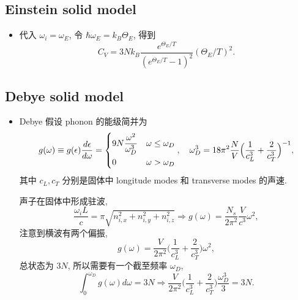 \subsection{Einstein solid model}
\begin{itemize}
	\item 代入 $\omega_i = \omega_E$, 令 $\hbar \omega_E = k_B \Theta_E$, 得到
	\begin{equation}
		C_V = 3 N k_B \frac{e^{\Theta_E / T}}{(e^{\Theta_E / T} - 1)^2} (\Theta_E / T)^2.
	\end{equation}
\end{itemize}

\subsection{Debye solid model}
\begin{itemize}
	\item Debye 假设 phonon 的能级简并为
	\begin{equation}
		g(\omega) \equiv g(\epsilon) \frac{d\epsilon}{d\omega} = \begin{dcases}
			9 N \frac{\omega^2}{\omega_D^3} & \omega \leq \omega_D \\
			0 & \omega > \omega_D
		\end{dcases}, \quad \omega_D^3 = 18 \pi^2 \frac{N}{V} \Big( \frac{1}{c_L^3} + \frac{2}{c_T^3} \Big)^{- 1},
	\end{equation}
	其中 $c_L, c_T$ 分别是固体中 longitude modes 和 transverse modes 的声速.
	
	\begin{tcolorbox}[title=calculation:]
		声子在固体中形成驻波,
		\begin{equation}
			\frac{\omega_i L}{c} = \pi \sqrt{n_{i, x}^2 + n_{i, y}^2 + n_{i, z}^2} \Longrightarrow g(\omega) = \frac{N_s}{2 \pi^2} \frac{V}{c^3} \omega^2,
		\end{equation}
		注意到横波有两个偏振,
		\begin{equation}
			g(\omega) = \frac{V}{2 \pi^2} \Big( \frac{1}{c_L^3} + \frac{2}{c_T^3} \Big) \omega^2,
		\end{equation}
		总状态为 $3 N$, 所以需要有一个截至频率 $\omega_D$,
		\begin{equation}
			\int_0^{\omega_D} g(\omega) d\omega = 3 N \Longrightarrow \frac{V}{2 \pi^2} \Big( \frac{1}{c_L^3} + \frac{2}{c_T^3} \Big) \frac{\omega_D^3}{3} = 3 N.
		\end{equation}
	\end{tcolorbox}
	

\end{itemize}
